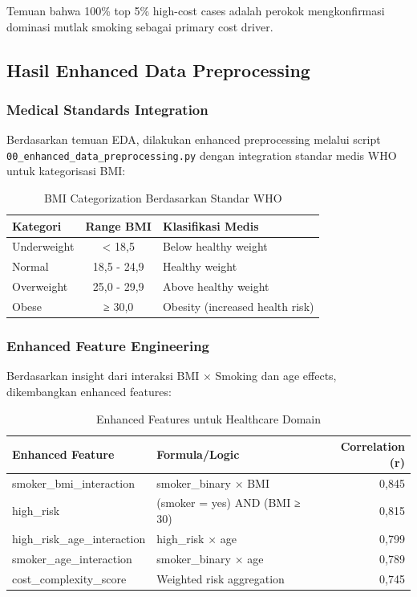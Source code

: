 Temuan bahwa 100\% top 5\% high-cost cases adalah perokok mengkonfirmasi dominasi mutlak smoking sebagai primary cost driver.

\subsection{Hasil Enhanced Data Preprocessing}
\label{subsec:hasil-preprocessing}

\subsubsection{Medical Standards Integration}

Berdasarkan temuan EDA, dilakukan enhanced preprocessing melalui script \texttt{00\_enhanced\_data\_preprocessing.py} dengan integration standar medis WHO untuk kategorisasi BMI:

\begin{table}[H]
\centering
\caption{BMI Categorization Berdasarkan Standar WHO}
\label{tab:bmi-who-standards}
\begin{tabular}{|l|c|l|}
\hline
\textbf{Kategori} & \textbf{Range BMI} & \textbf{Klasifikasi Medis} \\
\hline
Underweight & < 18,5 & Below healthy weight \\
Normal & 18,5 - 24,9 & Healthy weight \\
Overweight & 25,0 - 29,9 & Above healthy weight \\
Obese & ≥ 30,0 & Obesity (increased health risk) \\
\hline
\end{tabular}
\end{table}

\subsubsection{Enhanced Feature Engineering}

Berdasarkan insight dari interaksi BMI × Smoking dan age effects, dikembangkan enhanced features:

\begin{table}[H]
\centering
\caption{Enhanced Features untuk Healthcare Domain}
\label{tab:enhanced-features}
\begin{tabular}{|l|l|r|}
\hline
\textbf{Enhanced Feature} & \textbf{Formula/Logic} & \textbf{Correlation (r)} \\
\hline
smoker\_bmi\_interaction & smoker\_binary × BMI & 0,845 \\
high\_risk & (smoker = yes) AND (BMI ≥ 30) & 0,815 \\
high\_risk\_age\_interaction & high\_risk × age & 0,799 \\
smoker\_age\_interaction & smoker\_binary × age & 0,789 \\
cost\_complexity\_score & Weighted risk aggregation & 0,745 \\
\hline
\end{tabular}
\end{table}

